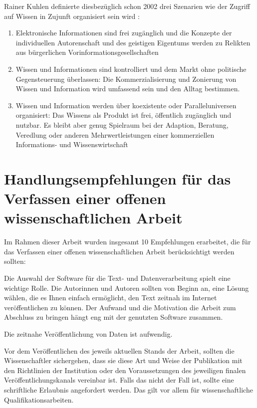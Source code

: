 Rainer Kuhlen definierte diesbezüglich schon 2002 drei Szenarien wie der Zugriff auf Wissen in Zujunft organisiert sein wird \cite{Kuhlen_2002_universalaccess}:
\begin{enumerate}
\item Elektronische Informationen sind frei zugänglich und die Konzepte der individuellen Autorenschaft und des geistigen Eigentums werden zu Relikten aus bürgerlichen Vorinformationsgesellschaften
\item Wissen und Informationen sind kontrolliert und dem Markt ohne politische Gegensteuerung überlassen: Die Kommerzialisierung und Zonierung von Wissen und Information wird umfassend sein und den Alltag bestimmen.
\item Wissen und Information werden über koexistente oder Paralleluniversen organisiert: Das Wissens als Produkt ist frei, öffentlich zugänglich und nutzbar. Es bleibt aber genug Spielraum bei der Adaption, Beratung, Veredlung oder anderen Mehrwertleistungen einer kommerziellen Informations- und Wissenswirtschaft
\end{enumerate}

\section{Handlungsempfehlungen für das Verfassen einer offenen wissenschaftlichen Arbeit}

Im Rahmen dieser Arbeit wurden insgesamt 10 Empfehlungen erarbeitet, die für das Verfassen einer offenen wissenschaftlichen Arbeit berücksichtigt werden sollten:

Die Auswahl der Software für die Text- und Datenverarbeitung spielt eine wichtige Rolle. Die Autorinnen und Autoren sollten von Beginn an, eine Lösung wählen, die es Ihnen einfach ermöglicht, den Text zeitnah im Internet veröffentlichen zu können. Der Aufwand und die Motivation die Arbeit zum Abschluss zu bringen hängt eng mit der genutzten Software zusammen.

Die zeitnahe Veröffentlichung von Daten ist aufwendig.

Vor dem Veröffentlichen des jeweils aktuellen Stands der Arbeit, sollten die Wissenschaftler sichergehen, dass sie diese Art und Weise der Publikation mit den Richtlinien der Institution oder den Voraussetzungen des jeweiligen finalen Veröffentlichungskanals vereinbar ist. Falls das nicht der Fall ist, sollte eine schriftliche Erlaubnis angefordert werden. Das gilt vor allem für wissenschaftliche Qualifikationsarbeiten.

